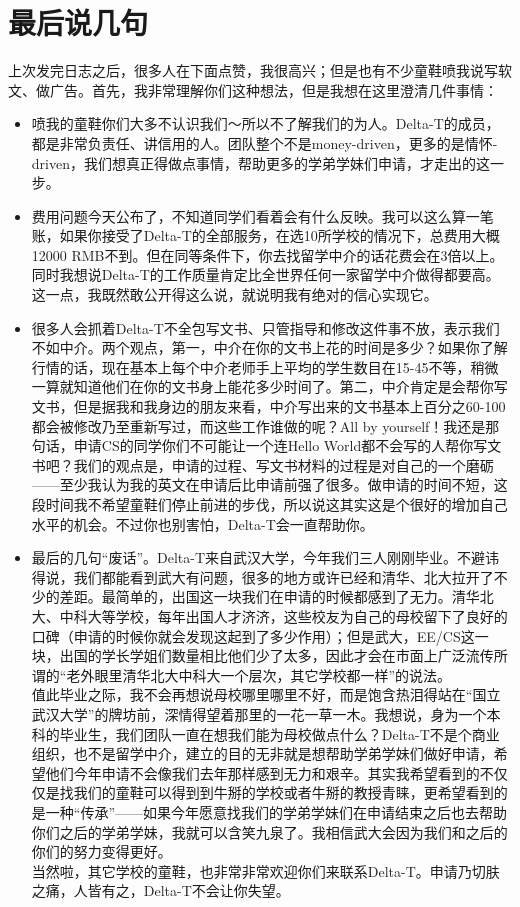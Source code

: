 \documentclass{article}
\begin{document}
\section{最后说几句}
上次发完日志之后，很多人在下面点赞，我很高兴；但是也有不少童鞋喷我说写软文、做广告。首先，我非常理解你们这种想法，但是我想在这里澄清几件事情：
\begin{itemize}
\item{喷我的童鞋你们大多不认识我们～所以不了解我们的为人。Delta-T的成员，都是非常负责任、讲信用的人。团队整个不是money-driven，更多的是情怀-driven，我们想真正得做点事情，帮助更多的学弟学妹们申请，才走出的这一步。}
\item{费用问题今天公布了，不知道同学们看着会有什么反映。我可以这么算一笔账，如果你接受了Delta-T的全部服务，在选10所学校的情况下，总费用大概12000 RMB不到。但在同等条件下，你去找留学中介的话花费会在3倍以上。同时我想说Delta-T的工作质量肯定比全世界任何一家留学中介做得都要高。这一点，我既然敢公开得这么说，就说明我有绝对的信心实现它。}
\item{很多人会抓着Delta-T不全包写文书、只管指导和修改这件事不放，表示我们不如中介。两个观点，第一，中介在你的文书上花的时间是多少？如果你了解行情的话，现在基本上每个中介老师手上平均的学生数目在15-45不等，稍微一算就知道他们在你的文书身上能花多少时间了。第二，中介肯定是会帮你写文书，但是据我和我身边的朋友来看，中介写出来的文书基本上百分之60-100都会被修改乃至重新写过，而这些工作谁做的呢？All by yourself！我还是那句话，申请CS的同学你们不可能让一个连Hello World都不会写的人帮你写文书吧？我们的观点是，申请的过程、写文书材料的过程是对自己的一个磨砺——至少我认为我的英文在申请后比申请前强了很多。做申请的时间不短，这段时间我不希望童鞋们停止前进的步伐，所以说这其实这是个很好的增加自己水平的机会。不过你也别害怕，Delta-T会一直帮助你。}
\item{最后的几句“废话”。Delta-T来自武汉大学，今年我们三人刚刚毕业。不避讳得说，我们都能看到武大有问题，很多的地方或许已经和清华、北大拉开了不少的差距。最简单的，出国这一块我们在申请的时候都感到了无力。清华北大、中科大等学校，每年出国人才济济，这些校友为自己的母校留下了良好的口碑（申请的时候你就会发现这起到了多少作用）；但是武大，EE/CS这一块，出国的学长学姐们数量相比他们少了太多，因此才会在市面上广泛流传所谓的“老外眼里清华北大中科大一个层次，其它学校都一样”的说法。\\值此毕业之际，我不会再想说母校哪里哪里不好，而是饱含热泪得站在“国立武汉大学”的牌坊前，深情得望着那里的一花一草一木。我想说，身为一个本科的毕业生，我们团队一直在想我们能为母校做点什么？Delta-T不是个商业组织，也不是留学中介，建立的目的无非就是想帮助学弟学妹们做好申请，希望他们今年申请不会像我们去年那样感到无力和艰辛。\textcolor{colorname}{其实我希望看到的不仅仅是找我们的童鞋可以得到到牛掰的学校或者牛掰的教授青睐，更希望看到的是一种“传承”——如果今年愿意找我们的学弟学妹们在申请结束之后也去帮助你们之后的学弟学妹，我就可以含笑九泉了。我相信武大会因为我们和之后的你们的努力变得更好。}\\
\textcolor{colorname2}{当然啦，其它学校的童鞋，也非常非常欢迎你们来联系Delta-T。申请乃切肤之痛，人皆有之，Delta-T不会让你失望。}}
\end{itemize}
	
\end{document}
